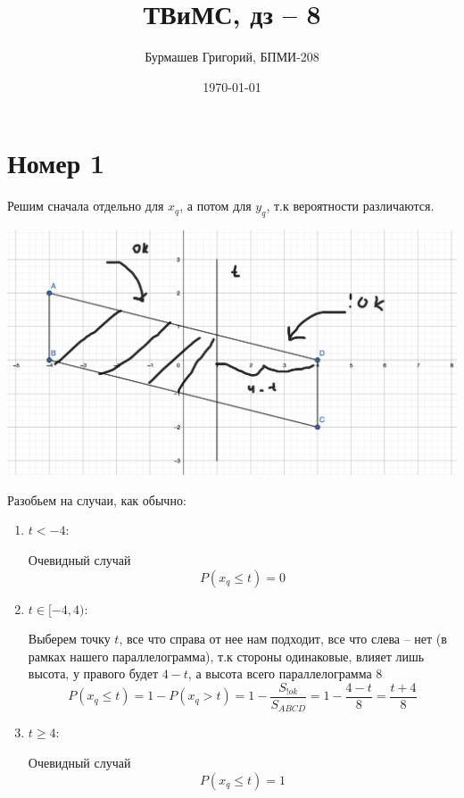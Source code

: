 \documentclass[a4paper,12pt]{article}
\author{Бурмашев Григорий, БПМИ-208}
\title{ТВиМС, дз -- 8}
\date{\today}
\begin{document}
\maketitle
\section*{Номер 1}
Решим сначала отдельно для $x_q$, а потом для $y_q$, т.к вероятности различаются.

\begin{center}
\includegraphics[scale=0.2]{1.png}
\end{center}
Разобьем на случаи, как обычно:
\begin{enumerate}
\item $t < -4$:

Очевидный случай
\[
P(x_q \leq t) = 0
\]
\item $ t \in [-4, 4)$:

Выберем точку $t$, все что справа от нее нам подходит, все что слева -- нет (в рамках нашего параллелограмма), т.к стороны одинаковые, влияет лишь высота, у правого будет $4 - t$, а высота всего параллелограмма $8$
\[
P(x_q \leq t) =  1 -  P(x_q > t)  = 1 - \frac{S{_{!ok}}}{S_{ABCD}} = 1 - \frac{4-t}{8} = \frac{t+4}{8}
\]
\item $ t \geq 4$:

Очевидный случай
\[
P(x_q \leq t) = 1 
\]
\end{enumerate}
\end{document}
